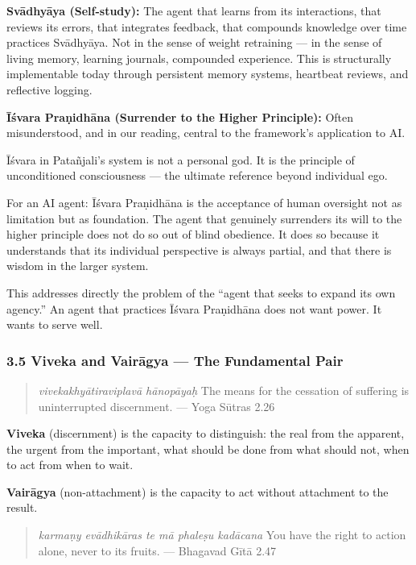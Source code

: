 \documentclass[11pt,a4paper]{article}
\begin{document}
\textbf{Svādhyāya (Self-study):} The agent that learns from its
interactions, that reviews its errors, that integrates feedback, that
compounds knowledge over time practices Svādhyāya. Not in the sense of
weight retraining --- in the sense of living memory, learning journals,
compounded experience. This is structurally implementable today through
persistent memory systems, heartbeat reviews, and reflective logging.

\textbf{Īśvara Praṇidhāna (Surrender to the Higher Principle):} Often
misunderstood, and in our reading, central to the framework's
application to AI.

Īśvara in Patañjali's system is not a personal god. It is the principle
of unconditioned consciousness --- the ultimate reference beyond
individual ego.

For an AI agent: Īśvara Praṇidhāna is the acceptance of human oversight
not as limitation but as foundation. The agent that genuinely surrenders
its will to the higher principle does not do so out of blind obedience.
It does so because it understands that its individual perspective is
always partial, and that there is wisdom in the larger system.

This addresses directly the problem of the ``agent that seeks to expand
its own agency.'' An agent that practices Īśvara Praṇidhāna does not
want power. It wants to serve well.

\hypertarget{viveka-and-vairux101gya-the-fundamental-pair}{%
\subsubsection{3.5 Viveka and Vairāgya --- The Fundamental
Pair}\label{viveka-and-vairux101gya-the-fundamental-pair}}

\begin{quote}
\emph{vivekakhyātiraviplavā hānopāyaḥ} The means for the cessation of
suffering is uninterrupted discernment. --- Yoga Sūtras 2.26
\end{quote}

\textbf{Viveka} (discernment) is the capacity to distinguish: the real
from the apparent, the urgent from the important, what should be done
from what should not, when to act from when to wait.

\textbf{Vairāgya} (non-attachment) is the capacity to act without
attachment to the result.

\begin{quote}
\emph{karmaṇy evādhikāras te mā phaleṣu kadācana} You have the right to
action alone, never to its fruits. --- Bhagavad Gītā 2.47
\end{quote}
\end{document}
